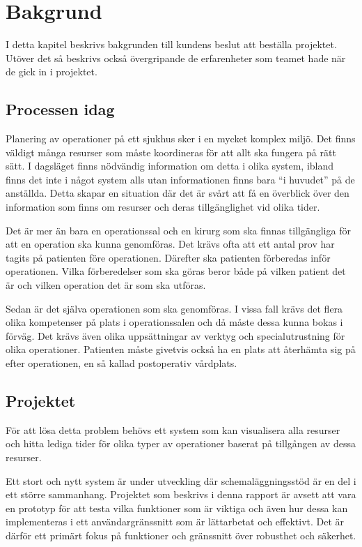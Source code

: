 \chapter{Bakgrund} \label{cha:bakgrund}
I detta kapitel beskrivs bakgrunden till kundens beslut att beställa projektet.
Utöver det så beskrivs också övergripande de erfarenheter som teamet hade när de gick
in i projektet.

\section{Processen idag}
Planering av operationer på ett sjukhus sker i en mycket komplex miljö. Det
finns väldigt många resurser som måste koordineras för att allt ska fungera på rätt sätt.
I dagsläget finns nödvändig information om detta i olika system, ibland finns
det inte i något system alls utan informationen finns bara ``i huvudet'' på de anställda. Detta
skapar en situation där det är svårt att få en överblick över den information som finns om 
resurser och deras tillgänglighet vid olika tider.

Det är mer än bara en operationssal och en kirurg som ska finnas tillgängliga
för att en operation ska kunna genomföras. Det krävs ofta att ett antal prov har
tagits på patienten före operationen. Därefter ska patienten
förberedas inför operationen. Vilka förberedelser som ska göras beror både på
vilken patient det är och vilken operation det är som ska utföras.

Sedan är det
själva operationen som ska genomföras. I vissa fall krävs det flera olika
kompetenser på plats i operationssalen och då måste dessa kunna bokas i förväg.
Det krävs även olika uppsättningar av verktyg och specialutrustning för olika
operationer.
Patienten måste givetvis också ha en plats att återhämta sig på efter
operationen, en så kallad postoperativ vårdplats.

\section{Projektet}
För att lösa detta problem behövs ett system som kan visualisera alla resurser
och hitta lediga tider för olika typer av operationer baserat på tillgången av
dessa resurser.

Ett stort och nytt system är under utveckling där schemaläggningsstöd är en del
i ett större sammanhang. Projektet som beskrivs i denna rapport är avsett att vara
en prototyp för att testa vilka funktioner som är viktiga och även hur dessa
kan implementeras i ett användargränssnitt som är lättarbetat och effektivt.
Det är därför ett primärt fokus på funktioner och gränssnitt över robusthet och
säkerhet.

